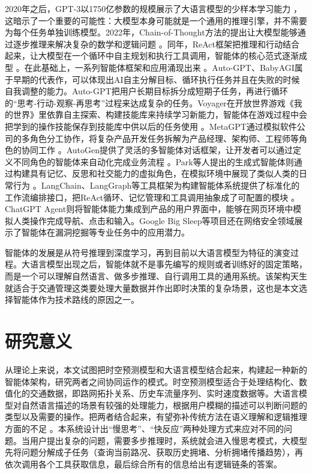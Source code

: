 2020年之后，GPT-3以1750亿参数的规模展示了大语言模型的少样本学习能力 ，这暗示了一个重要的可能性：大模型本身可能就是一个通用的推理引擎，并不需要为每个任务单独训练模型。2022年，Chain-of-Thought方法的提出让大模型能够通过逐步推理来解决复杂的数学和逻辑问题 。同年，ReAct框架把推理和行动结合起来，让大模型在一个循环中自主规划和执行工具调用，智能体的核心范式逐渐成型 。在此基础上，一系列智能体框架和应用涌现出来 。Auto-GPT、BabyAGI属于早期的代表作，可以体现出AI自主分解目标、循环执行任务并且在失败的时候自我调整的能力。Auto-GPT把用户长期目标拆分成短期子任务，再进行循环的“思考-行动-观察-再思考”过程来达成复杂的任务。Voyager在开放世界游戏《我的世界》里依靠自主探索、构建技能库来持续学习新能力，智能体在游戏过程中会把学到的操作技能保存到技能库中供以后的任务使用 。MetaGPT通过模拟软件公司的多角色分工协作，将复杂产品开发任务拆解为产品经理、架构师、工程师等角色的协同工作 。AutoGen提供了灵活的多智能体对话框架，让开发者可以通过定义不同角色的智能体来自动化完成业务流程 。Park等人提出的生成式智能体则通过构建具有记忆、反思和社交能力的虚拟角色，在模拟环境中展现了类似人类的日常行为 。LangChain、LangGraph等工具框架为构建智能体系统提供了标准化的工作流编排接口，把ReAct循环、记忆管理和工具调用抽象成了可配置的模块 。ChatGPT Agent则将智能体能力集成到产品的用户界面中，能够在网页环境中模拟人类操作完成导航、点击和输入。Google Big Sleep等项目还在网络安全领域展示了智能体在漏洞挖掘等专业任务中的应用潜力。

智能体的发展是从符号推理到深度学习，再到目前以大语言模型为特征的演变过程。大语言模型出现之后，智能体就不是事先编写的规则或者训练好的固定策略，而是一个可以理解自然语言、做多步推理、自行调用工具的通用系统。该架构天生就适合于交通管理这类要处理大量数据并作出即时决策的复杂场景，这也是本文选择智能体作为技术路线的原因之一。

\section{研究意义}

从理论上来说，本文试图把时空预测模型和大语言模型结合起来，构建起一种新的智能体架构，研究两者之间协同运作的模式。时空预测模型适合于处理结构化、数值化的交通数据，即路网拓扑关系、历史车流量序列、实时速度数据等。大语言模型对自然语言描述的场景有较强的处理能力，根据用户模糊的描述可以判断问题的类型以及需要的操作。把两者结合起来，有望弥补传统方法在语义理解和逻辑推理方面的不足 。本系统设计出“慢思考”、“快反应”两种处理方式来应对不同的问题。当用户提出复杂的问题，需要多步推理时，系统就会进入慢思考模式，大模型先将问题分解成子任务（查询当前路况、获取历史拥堵、分析拥堵传播趋势），再依次调用各个工具获取信息，最后综合所有的信息给出有逻辑链条的答案。

